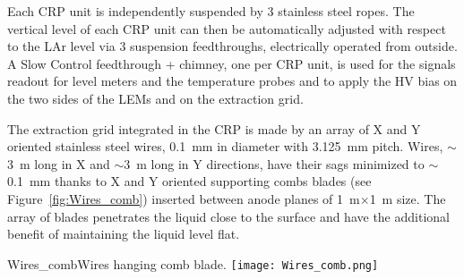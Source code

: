 Each CRP unit is independently suspended by 3 stainless steel
ropes. The vertical level of each CRP unit can then be automatically
adjusted with respect to the LAr level via 3 suspension feedthroughs,
electrically operated from outside. A Slow Control feedthrough +
chimney, one per CRP unit, is used for the signals readout for level
meters and the temperature probes and to apply the HV bias on the two
sides of the LEMs and on the extraction grid.

The extraction grid integrated in the CRP is made by an array of X and
Y oriented stainless steel wires, 0.1~mm in diameter with 3.125~mm
pitch.  Wires, $\sim$3~m long in X and $\sim$3~m long in Y directions,
have their sags minimized to $\sim$0.1~mm thanks to X and Y oriented
supporting combs blades (see Figure~\ref{fig:Wires_comb}) inserted
between anode planes of 1~m$\times$1~m size. The array of blades
penetrates the liquid close to the surface and have the additional
benefit of maintaining the liquid level flat.
\begin{cdrfigure}{Wires_comb}{Wires hanging comb blade.}
\texttt{[image: Wires\_comb.png]}
\end{cdrfigure}


